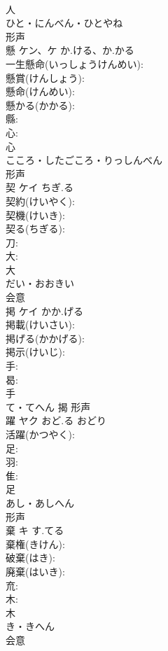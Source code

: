 \documentclass[8pt]{extreport}
\begin{document}
\begin{CJK}{UTF8}{min}
\\	人	
\\	ひと・にんべん・ひとやね	
\\	形声 
\\	懸	ケン、ケ	か.ける、か.かる		
\\	一生懸命(いっしょうけんめい): 
\\	懸賞(けんしょう): 
\\	懸命(けんめい): 
\\	懸かる(かかる): 
\\	縣: 
\\	心: 
\\	心	
\\	こころ・したごころ・りっしんべん	
\\	形声 
\\	契	ケイ	ちぎ.る		
\\	契約(けいやく): 
\\	契機(けいき): 
\\	契る(ちぎる): 
\\	刀: 
\\	大: 
\\	大	
\\	だい・おおきい	
\\	会意 
\\	掲	ケイ	かか.げる		
\\	掲載(けいさい): 
\\	掲げる(かかげる): 
\\	掲示(けいじ): 
\\	手: 
\\	曷: 
\\	手	
\\	て・てへん	揭	形声 
\\	躍	ヤク	おど.る	おどり	
\\	活躍(かつやく): 
\\	足: 
\\	羽: 
\\	隹: 
\\	足	
\\	あし・あしへん	
\\	形声 
\\	棄	キ	す.てる		
\\	棄権(きけん): 
\\	破棄(はき): 
\\	廃棄(はいき): 
\\	㐬: 
\\	木: 
\\	木	
\\	き・きへん	
\\	会意 

\end{CJK}
\end{document}

